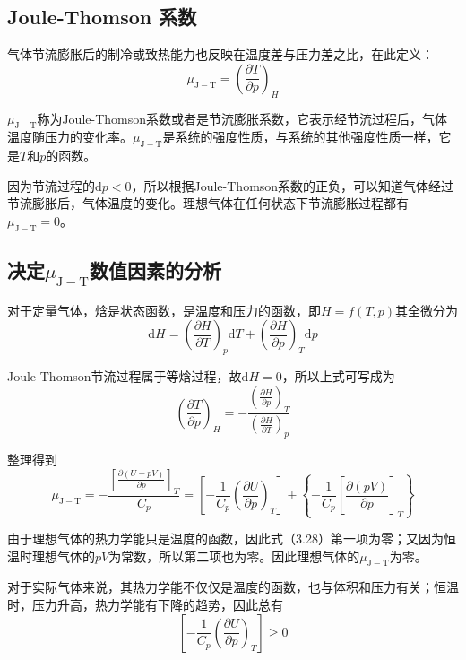 \documentclass[lang=cn,newtx,10pt,scheme=chinese]{elegantbook}
\begin{document}
\subsection{Joule-Thomson 系数}
气体节流膨胀后的制冷或致热能力也反映在温度差与压力差之比，在此定义：
\begin{equation}
	\mu_{\mathrm{J-T}} = \left ( \frac{\partial T}{\partial p}  \right )_H
\end{equation}

$\mu_\mathrm{J-T}$称为Joule-Thomson系数或者是节流膨胀系数，它表示经节流过程后，气体温度随压力的变化率。$\mu_\mathrm{J-T}$是系统的强度性质，与系统的其他强度性质一样，它是$T$和$p$的函数。

因为节流过程的$\mathrm{d}p<0$，所以根据Joule-Thomson系数的正负，可以知道气体经过节流膨胀后，气体温度的变化。理想气体在任何状态下节流膨胀过程都有$\mu_\mathrm{J-T}=0$。

\subsection{决定$\mu_\mathrm{J-T}$数值因素的分析}
对于定量气体，焓是状态函数，是温度和压力的函数，即$H=f(T,p)$其全微分为
$$
\mathrm{d}H=\left ( \frac{\partial H}{\partial T}  \right )_p\mathrm{d}T+\left ( \frac{\partial H}{\partial p}  \right )_T\mathrm{d}p  
$$

Joule-Thomson节流过程属于等焓过程，故$\mathrm{d}H=0$，所以上式可写成为
$$
\left ( \frac{\partial T}{\partial p}  \right )_H=-\frac{\left (\displaystyle  \frac{\partial H}{\partial p}  \right )_T }{\left (\displaystyle  \frac{\partial H}{\partial T}  \right )_p } 
$$

整理得到
\begin{equation}
	\mu_{\mathrm{J-T}} = -\frac{\left [ \displaystyle \frac{\partial (U+pV)}{\partial p}  \right ]_T }{C_p} =\left [ -\frac{1}{C_p}\left ( \frac{\partial U}{\partial p}  \right )_T \right ] +\left \{ -\frac{1}{C_p} \left [ \frac{\partial (pV)}{\partial p}   \right ]_T  \right \} 
\end{equation}

由于理想气体的热力学能只是温度的函数，因此式（3.28）第一项为零；又因为恒温时理想气体的$pV$为常数，所以第二项也为零。因此理想气体的$\mu_{\mathrm{J-T}}$为零。

对于实际气体来说，其热力学能不仅仅是温度的函数，也与体积和压力有关；恒温时，压力升高，热力学能有下降的趋势，因此总有
\begin{equation}
	\left [ -\frac{1}{C_p}\left ( \frac{\partial U}{\partial p}  \right )_T \right ] \geqslant 0
\end{equation}
\end{document}
